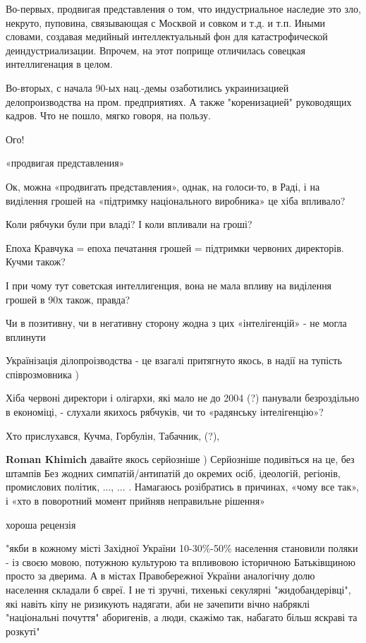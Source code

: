 \begin{itemize}
\begin{itemize}
Во-первых, продвигая представления о том, что индустриальное наследие это зло,
некруто, пуповина, связывающая с Москвой и совком и т.д. и т.п. Иными словами,
создавая медийный интеллектуальный фон для катастрофической деиндустриализации.
Впрочем, на этот поприще отличилась совецкая интеллигенация в целом.

Во-вторых, с начала 90-ых нац.-демы озаботились украинизацией делопроизводства
на пром. предприятиях. А также "коренизацией" руководящих кадров. Что не пошло,
мягко говоря, на пользу.


Ого!

«продвигая представления»

Ок, можна «продвигать представления», однак, на голоси-то, в Раді, і на
виділення грошей на «підтримку національного виробника» це хіба впливало?

Коли рябчуки були при владі? І коли впливали на гроші?

Епоха Кравчука = епоха печатання грошей = підтримки червоних директорів. Кучми
також?

І при чому тут советская интеллигенция, вона не мала впливу на виділення грошей
в 90х також, правда?

Чи в позитивну, чи в негативну сторону жодна з цих «інтелігенцій» - не могла
вплинути

Українізація ділопроізводства - це взагалі притягнуто якось, в надії на тупість
співрозмовника )

Хіба червоні директори і олігархи, які мало не до 2004 (?) панували
безроздільно в економіці, - слухали якихось рябчуків, чи то «радянську
інтелігенцію»?

Хто прислухався, Кучма, Горбулін, Табачник, (?),

\textbf{Roman Khimich} давайте якось серйозніше )
Серйозніше подивіться на це, без штампів
Без жодних симпатій/антипатій до окремих осіб, ідеологій, регіонів, промислових політик, ..., ... .
Намагаюсь розібратись в причинах, «чому все так», і «хто в поворотний момент прийняв неправильне рішення»
\end{itemize} %

хороша рецензія


"якби в кожному місті Західної України 10-30\%-50\% населення становили поляки -
із своєю мовою, потужною культурою та впливовою історичною Батьківщиною просто
за дверима. А в містах Правобережної України аналогічну долю населення складали
б євреї. І не ті зручні, тихенькі секулярні "жидобандерівці", які навіть кіпу
не ризикують надягати, аби не зачепити вічно набряклі "національні почуття"
аборигенів, а люди, скажімо так, набагато більш яскраві та розкуті"


\end{itemize}
